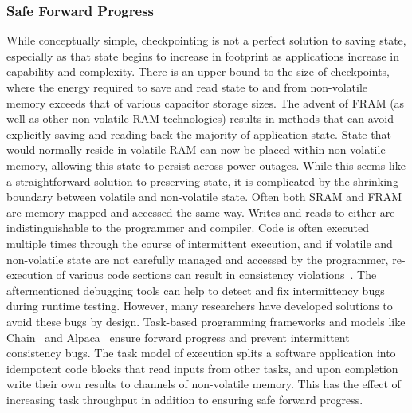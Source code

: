 \subsubsection{Safe Forward Progress}
While conceptually simple, checkpointing is not a perfect solution to saving state, especially as that state begins to increase in footprint as applications increase in capability and complexity. There is an upper bound to the size of checkpoints, where the energy required to save and read state to and from non-volatile memory exceeds that of various capacitor storage sizes.
The advent of FRAM (as well as other non-volatile RAM technologies) results in methods that can avoid explicitly saving and reading back the majority of application state. State that would normally reside in volatile RAM can now be placed within non-volatile memory, allowing this state to persist across power outages.
While this seems like a straightforward solution to preserving state, it is complicated by the shrinking
boundary between volatile and non-volatile state. Often both SRAM and FRAM are memory mapped and accessed the same way. Writes and reads to either are indistinguishable to the programmer and compiler.
Code is often executed multiple times through the course of intermittent execution, and if volatile and non-volatile state are not carefully managed and accessed by the programmer, re-execution of various code sections can result in consistency violations~\cite{maeng2017alpaca}.
The aftermentioned debugging tools can help to detect and fix intermittency bugs during runtime testing. However, many researchers have developed solutions to avoid these bugs by design.
Task-based programming frameworks and models like
Chain~\cite{colin2016chain} and Alpaca~\cite{maeng2017alpaca} 
ensure forward progress and prevent intermittent consistency bugs.
The task model of execution splits a software application into idempotent code blocks that read inputs from other tasks, and upon completion write their own results to channels of non-volatile memory. This has the effect of increasing task throughput in addition to ensuring safe forward progress.

